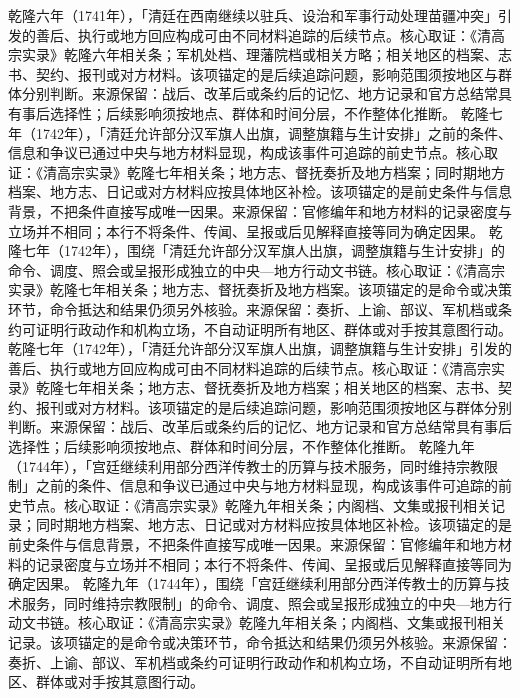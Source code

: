 乾隆六年（1741年），「清廷在西南继续以驻兵、设治和军事行动处理苗疆冲突」引发的善后、执行或地方回应构成可由不同材料追踪的后续节点。核心取证：《清高宗实录》乾隆六年相关条；军机处档、理藩院档或相关方略；相关地区的档案、志书、契约、报刊或对方材料。该项锚定的是后续追踪问题，影响范围须按地区与群体分别判断。来源保留：战后、改革后或条约后的记忆、地方记录和官方总结常具有事后选择性；后续影响须按地点、群体和时间分层，不作整体化推断。
乾隆七年（1742年），「清廷允许部分汉军旗人出旗，调整旗籍与生计安排」之前的条件、信息和争议已通过中央与地方材料显现，构成该事件可追踪的前史节点。核心取证：《清高宗实录》乾隆七年相关条；地方志、督抚奏折及地方档案；同时期地方档案、地方志、日记或对方材料应按具体地区补检。该项锚定的是前史条件与信息背景，不把条件直接写成唯一因果。来源保留：官修编年和地方材料的记录密度与立场并不相同；本行不将条件、传闻、呈报或后见解释直接等同为确定因果。
乾隆七年（1742年），围绕「清廷允许部分汉军旗人出旗，调整旗籍与生计安排」的命令、调度、照会或呈报形成独立的中央—地方行动文书链。核心取证：《清高宗实录》乾隆七年相关条；地方志、督抚奏折及地方档案。该项锚定的是命令或决策环节，命令抵达和结果仍须另外核验。来源保留：奏折、上谕、部议、军机档或条约可证明行政动作和机构立场，不自动证明所有地区、群体或对手按其意图行动。
乾隆七年（1742年），「清廷允许部分汉军旗人出旗，调整旗籍与生计安排」引发的善后、执行或地方回应构成可由不同材料追踪的后续节点。核心取证：《清高宗实录》乾隆七年相关条；地方志、督抚奏折及地方档案；相关地区的档案、志书、契约、报刊或对方材料。该项锚定的是后续追踪问题，影响范围须按地区与群体分别判断。来源保留：战后、改革后或条约后的记忆、地方记录和官方总结常具有事后选择性；后续影响须按地点、群体和时间分层，不作整体化推断。
乾隆九年（1744年），「宫廷继续利用部分西洋传教士的历算与技术服务，同时维持宗教限制」之前的条件、信息和争议已通过中央与地方材料显现，构成该事件可追踪的前史节点。核心取证：《清高宗实录》乾隆九年相关条；内阁档、文集或报刊相关记录；同时期地方档案、地方志、日记或对方材料应按具体地区补检。该项锚定的是前史条件与信息背景，不把条件直接写成唯一因果。来源保留：官修编年和地方材料的记录密度与立场并不相同；本行不将条件、传闻、呈报或后见解释直接等同为确定因果。
乾隆九年（1744年），围绕「宫廷继续利用部分西洋传教士的历算与技术服务，同时维持宗教限制」的命令、调度、照会或呈报形成独立的中央—地方行动文书链。核心取证：《清高宗实录》乾隆九年相关条；内阁档、文集或报刊相关记录。该项锚定的是命令或决策环节，命令抵达和结果仍须另外核验。来源保留：奏折、上谕、部议、军机档或条约可证明行政动作和机构立场，不自动证明所有地区、群体或对手按其意图行动。
